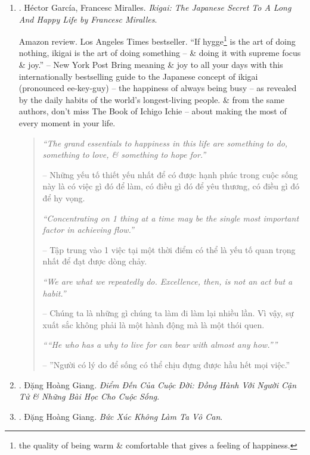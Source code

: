 \documentclass{article}
\begin{document}
\begin{enumerate}
	\item \cite{Garcia_Miralles_ikigai}. {\sc H\'ector Garc\'ia, Francesc Miralles}. {\it Ikigai: The Japanese Secret To A Long And Happy Life by Francesc Miralles}. {}
	
	{\sf Amazon review.} Los Angeles Times bestseller. ``If hygge\footnote{the quality of being warm \& comfortable that gives a feeling of happiness.} is the art of doing nothing, ikigai is the art of doing something -- \& doing it with supreme focus \& joy.'' -- New York Post Bring meaning \& joy to all your days with this internationally bestselling guide to the Japanese concept of ikigai (pronounced ee-key-guy) -- the happiness of always being busy -- as revealed by the daily habits of the world's longest-living people. \& from the same authors, don't miss The Book of Ichigo Ichie -- about making the most of every moment in your life.
	\begin{quotation}
		{\it``The grand essentials to happiness in this life are something to do, something to love, \& something to hope for.''}
		
		-- Những yếu tố thiết yếu nhất để có được hạnh phúc trong cuộc sống này là có việc gì đó để làm, có điều gì đó để yêu thương, có điều gì đó để hy vọng.
		
		{\it``Concentrating on 1 thing at a time may be the single most important factor in achieving flow.''}
		
		-- Tập trung vào 1 việc tại một thời điểm có thể là yếu tố quan trọng nhất để đạt được dòng chảy.
		
		{\it``We are what we repeatedly do. Excellence, then, is not an act but a habit.''}
		
		-- Chúng ta là những gì chúng ta làm đi làm lại nhiều lần. Vì vậy, sự xuất sắc không phải là một hành động mà là một thói quen.
		
		{\it````He who has a why to live for can bear with almost any how.''''}
		
		-- ''Người có lý do để sống có thể chịu đựng được hầu hết mọi việc.''
	\end{quotation}	
	
	\item \cite{Giang_death}. {\sc Đặng Hoàng Giang}. {\it Điểm Đến Của Cuộc Đời: Đồng Hành Với Người Cận Tử \& Những Bài Học Cho Cuộc Sống}.\hfill{\sf[done]}
	
	\item \cite{Giang_buc_xuc}. {\sc Đặng Hoàng Giang}. {\it Bức Xúc Không Làm Ta Vô Can}.\hfill{\sf[done]}
	

\end{enumerate}
\end{document}
